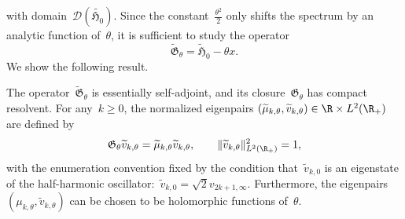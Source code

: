    with domain~$\mathcal D(\widetilde{\mathfrak H_0})$.
    Since the constant~$\frac{\theta^2}2$ only shifts the spectrum by an analytic function of~$\theta$, it is sufficient to study the operator
   ~$$\widetilde{\mathfrak{G}}_\theta = \widetilde{\mathfrak{H}}_0-\theta x.$$
   We show the following result.
   \begin{lemma}
    \label{02:lemma:spectral_analysis}
    The operator~$\widetilde{\mathfrak{G}}_\theta$ is essentially self-adjoint, and its closure~$\mathfrak{G}_\theta$ has compact resolvent. For any~$k\geq 0$, the normalized eigenpairs
    $\left(\widetilde\mu_{k,\theta},\widetilde v_{k,\theta}\right) \in \R\times L^2(\R_+)$
    are defined by
    \begin{equation}
        \label{02:eq:tilde_eigenrelations}
        \mathfrak{G}_\theta \widetilde v_{k,\theta} = \widetilde\mu_{k,\theta}\widetilde v_{k,\theta},\qquad \|\widetilde v_{k,\theta}\|^2_{L^2(\R_+)} =1,
    \end{equation}
    with the enumeration convention fixed by the condition that~$\widetilde v_{k,0}$ is an eigenstate of the half-harmonic oscillator:~$\widetilde v_{k,0} = \sqrt 2 v_{2k+1,\infty}$.
    Furthermore, the eigenpairs~$(\mu_{k,\theta},\widetilde v_{k,\theta})$ can be chosen to be holomorphic functions of~$\theta$.
   \end{lemma}

